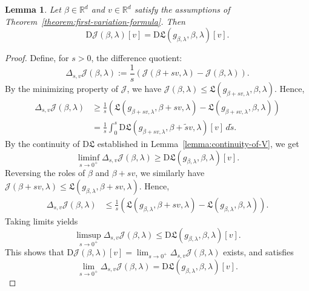\documentclass[sn-mathphys-num]{sn-jnl}%
\numberwithin{equation}{section}
\newcommand{\R}{\mathbb{R}}
\newtheorem{lemma}{Lemma}
\theoremstyle{thmstyleone}%
\theoremstyle{thmstyletwo}%
\theoremstyle{thmstylethree}%
\begin{document}
\vspace{1em} 
\begin{lemma}
\label{lemma:danskin-type-lemma}
Let $\beta \in \R^d$ and $v \in \R^d$ satisfy the assumptions of Theorem~\ref{theorem:first-variation-formula}. Then
\begin{equation}
\mathrm{D}\mathcal{J}(\beta,\lambda)[v] 
= \mathrm{D} \mathfrak{L}(g_{\beta, \lambda}, \beta, \lambda)[v].
\end{equation}
\end{lemma} 
\begin{proof} 
Define, for $s > 0$, the difference quotient: 
\begin{equation*}
	\Delta_{s, v} \mathcal{J}(\beta, \lambda):= 
		\frac{1}{s} (\mathcal{J}(\beta + sv, \lambda) - \mathcal{J}(\beta, \lambda)).
\end{equation*}
By the minimizing property of $\mathcal{J}$, we have
$
	\mathcal{J}(\beta, \lambda) \le \mathfrak{L}(g_{\beta + sv, \lambda}, \beta, \lambda)$. Hence, 
\begin{equation*}
\begin{split} 
	\Delta_{s, v} \mathcal{J}(\beta, \lambda) &\ge \frac{1}{s} \left(\mathfrak{L}(g_{\beta+sv, \lambda}, \beta+sv, \lambda)
		- \mathfrak{L}(g_{\beta+sv, \lambda}, \beta, \lambda)\right) \\
		&= \frac{1}{s} \int_0^s \mathrm{D}\mathfrak{L}(g_{\beta+sv, \lambda}, \beta + \tilde{s} v, \lambda)[v] \, d\tilde{s}.
\end{split} 
\end{equation*}
By the continuity of
$\mathrm{D}\mathfrak{L}$ established in Lemma~\ref{lemma:continuity-of-V}, we get
\begin{equation*}
	\liminf_{s \to 0^+} \Delta_{s, v} \mathcal{J}(\beta, \lambda)  \ge \mathrm{D}\mathfrak{L}(g_{\beta, \lambda}, \beta, \lambda)[v].
\end{equation*}
Reversing the roles of $\beta$ and $\beta+sv$, we similarly have $\mathcal{J}(\beta+sv, \lambda) \le \mathfrak{L}(g_{\beta, \lambda}, \beta+sv, \lambda)$. Hence,
\begin{equation*}
\begin{split} 
	\Delta_{s, v} \mathcal{J}(\beta, \lambda) &\le \frac{1}{s} \left(\mathfrak{L}(g_{\beta, \lambda}, \beta+sv, \lambda)
		- \mathfrak{L}(g_{\beta, \lambda}, \beta, \lambda)\right).
\end{split} 
\end{equation*}
Taking limits yields 
\begin{equation*}
	\limsup_{s \to 0^+} \Delta_{s, v} \mathcal{J}(\beta, \lambda)  \le \mathrm{D}\mathfrak{L}(g_{\beta, \lambda}, \beta, \lambda)[v].
\end{equation*} 
This shows that $\mathrm{D}\mathcal{J}(\beta, \lambda)[v] =\lim_{s \to 0^+} \Delta_{s, v} \mathcal{J}(\beta, \lambda)$ exists, and satisfies 
\begin{equation*}
	 \lim_{s \to 0^+} \Delta_{s, v} \mathcal{J}(\beta, \lambda)= \mathrm{D}\mathfrak{L}(g_{\beta, \lambda}, \beta, \lambda)[v].
\end{equation*}
\end{proof} 
\end{document}
